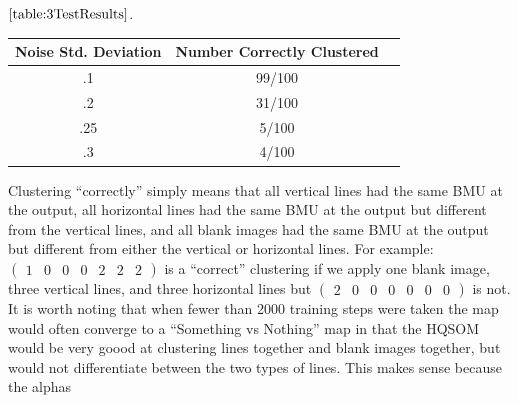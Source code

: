 \documentclass[a4paper,10pt]{article}
\begin{document}
$\ref{table:3TestResults}$.
\begin{center}
  \begin{tabular}{ | c | c | c | }
    \hline
    Noise Std. Deviation & Number Correctly Clustered\\ \hline
    .1 & 99/100 \\ \hline
    .2 & 31/100 \\ \hline
    .25 & 5/100 \\ \hline
    .3 &  4/100\\
    \hline
  \end{tabular}
\label{table:3TestResults}
\end{center}
Clustering ``correctly'' simply means that all vertical lines had the same BMU at the output, all
horizontal lines had the same BMU at the output but different from the vertical lines, and all
blank images had the same BMU at the output but different from either the vertical or horizontal
lines.  For example: $ \begin{pmatrix} 1 & 0 & 0 & 0 & 2 & 2 & 2 \end{pmatrix}$ is a ``correct''
clustering if we apply one blank image, three vertical lines, and three horizontal lines but $
\begin{pmatrix}  2 & 0 & 0 & 0 & 0 & 0 & 0 \end{pmatrix}$ is not. It is worth noting that when fewer
than 2000 training steps were taken the map would often converge to a ``Something vs Nothing'' map
in that the HQSOM would be very goood at clustering lines together and blank images together, but
would not differentiate between the two types of lines.  This makes sense because the alphas 
\end{document}
